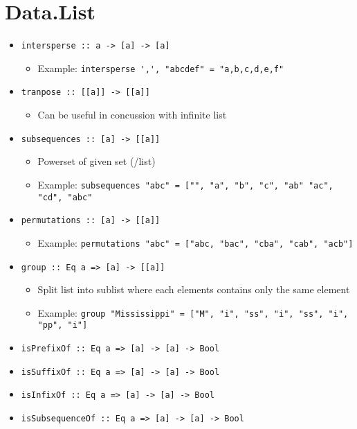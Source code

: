 
\section{Data.List}
\begin{itemize}
    \item \verb+intersperse :: a -> [a] -> [a]+
        \begin{itemize}
            \item Example: \verb+intersperse ',', "abcdef" = "a,b,c,d,e,f"+
        \end{itemize}
    \item \verb+tranpose :: [[a]] -> [[a]]+
        \begin{itemize}
            \item Can be useful in concussion with infinite list
        \end{itemize}
    \item \verb+subsequences :: [a] -> [[a]]+
        \begin{itemize}
            \item Powerset of given set (/list)
            \item Example: \verb+subsequences "abc" = ["", "a", "b", "c", "ab" "ac", "cd", "abc"+
        \end{itemize}
    \item \verb+permutations :: [a] -> [[a]]+
        \begin{itemize}
            \item Example: \verb+permutations "abc" = ["abc, "bac", "cba", "cab", "acb"]+
        \end{itemize}
    \item \verb+group :: Eq a => [a] -> [[a]]+
        \begin{itemize}
            \item Split list into sublist where each elements contains only the same element
            \item Example: \verb+group "Mississippi" = ["M", "i", "ss", "i", "ss", "i", "pp", "i"]+
        \end{itemize}
    \item \verb+isPrefixOf :: Eq a => [a] -> [a] -> Bool+
    \item \verb+isSuffixOf :: Eq a => [a] -> [a] -> Bool+
    \item \verb+isInfixOf :: Eq a => [a] -> [a] -> Bool+
    \item \verb+isSubsequenceOf :: Eq a => [a] -> [a] -> Bool+

\end{itemize}
